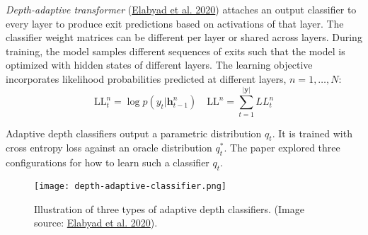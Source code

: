 \documentclass[12pt]{article}
\begin{document}
\emph{Depth-adaptive transformer} (\href{https://arxiv.org/abs/1910.10073}{Elabyad et al. 2020}) attaches an output classifier to every layer to produce exit predictions based on activations of that layer. The classifier weight matrices can be different per layer or shared across layers. During training, the model samples different sequences of exits such that the model is optimized with hidden states of different layers. The learning objective incorporates likelihood probabilities predicted at different layers, $n=1, \dots, N$:
\[
\text{LL}^n_t = \log p(y_t \vert \mathbf{h}^n_{t-1}) \quad
\text{LL}^n = \sum_{t=1}^{\vert\mathbf{y}\vert} LL^n_t
\] 

Adaptive depth classifiers output a parametric distribution $q_t$. It is trained with cross entropy loss against an oracle distribution $q^*_t$. The paper explored three configurations for how to learn such a classifier $q_t$.

\begin{figure}[h!]
    \centering
    \texttt{[image: depth-adaptive-classifier.png]}
    \caption{Illustration of three types of adaptive depth classifiers. (Image source: \href{https://arxiv.org/abs/1910.10073}{Elabyad et al. 2020}).}
\end{figure}
\end{document}
